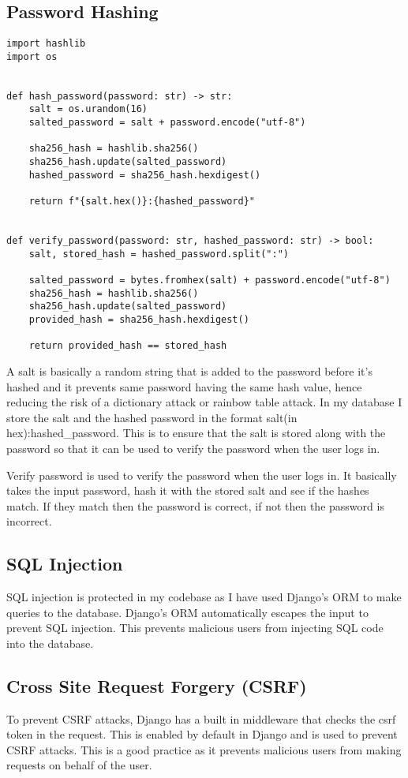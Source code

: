 \subsection{Password Hashing}
\begin{verbatim}
import hashlib
import os


def hash_password(password: str) -> str:
    salt = os.urandom(16)
    salted_password = salt + password.encode("utf-8")

    sha256_hash = hashlib.sha256()
    sha256_hash.update(salted_password)
    hashed_password = sha256_hash.hexdigest()

    return f"{salt.hex()}:{hashed_password}"


def verify_password(password: str, hashed_password: str) -> bool:
    salt, stored_hash = hashed_password.split(":")

    salted_password = bytes.fromhex(salt) + password.encode("utf-8")
    sha256_hash = hashlib.sha256()
    sha256_hash.update(salted_password)
    provided_hash = sha256_hash.hexdigest()

    return provided_hash == stored_hash

\end{verbatim}
A salt is basically a random string that is added to the password before it's hashed and it prevents same password having the same hash value, hence reducing the risk of a dictionary attack or rainbow table attack. In my database I store the salt and the hashed password in the format salt(in hex):hashed\_password. This is to ensure that the salt is stored along with the password so that it can be used to verify the password when the user logs in.

Verify password is used to verify the password when the user logs in. It basically takes the input password, hash it with the stored salt and see if the hashes match. If they match then the password is correct, if not then the password is incorrect.

\subsection{SQL Injection}
SQL injection is protected in my codebase as I have used Django's ORM to make queries to the database. Django's ORM automatically escapes the input to prevent SQL injection. This prevents malicious users from injecting SQL code into the database. 

\subsection{Cross Site Request Forgery (CSRF)}
To prevent CSRF attacks, Django has a built in middleware that checks the csrf token in the request. This is enabled by default in Django and is used to prevent CSRF attacks. This is a good practice as it prevents malicious users from making requests on behalf of the user.

